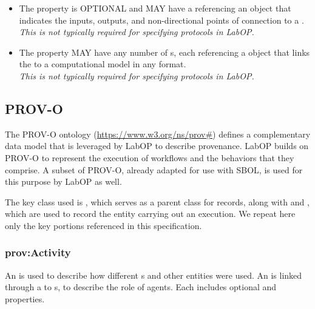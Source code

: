 \begin{itemize}
\item \label{sec:sbol:hasInterface}
The  property is OPTIONAL and MAY have a  referencing an  object that indicates the inputs, outputs, and non-directional points of connection to a .
\\{\em This is not typically required for specifying protocols in LabOP.}

\item \label{sec:sbol:hasModel}
The  property MAY have any number of s, each referencing a  object that links the  to a computational model in any format.
\\{\em This is not typically required for specifying protocols in LabOP.}
\end{itemize}

\subsection{PROV-O}

The PROV-O ontology (\url{https://www.w3.org/ns/prov#}) defines a complementary data model that is leveraged by LabOP to describe provenance.
LabOP builds on PROV-O to represent the execution of  workflows and the  behaviors that they comprise.
A subset of PROV-O, already adapted for use with SBOL, is used for this purpose by LabOP as well.

The key class used is , which serves as a parent class for  records, along with  and , which are used to record the entity carrying out an execution.
We repeat here only the key portions referenced in this specification.

\subsubsection{prov:Activity}
\label{sec:prov:Activity}

An  is used to describe how different s and other entities were used. An  is linked through a  to s, to describe the role of agents.
Each  includes optional  and  properties. 

